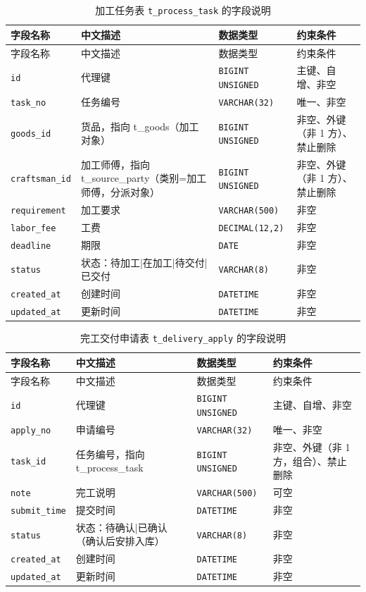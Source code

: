 \documentclass[12pt, a4paper]{ctexart}
\newcommand{\code}[1]{\texttt{\small #1}}
\begin{document}
\begin{longtable}{@{}p{3.1cm} p{4.5cm} p{2.4cm} p{4.5cm}@{}}
\caption{加工任务表 \code{t\_process\_task} 的字段说明}\label{tab:f-t-process-task}\\
\toprule
字段名称 & 中文描述 & 数据类型 & 约束条件 \\
\midrule
\endfirsthead
\toprule
字段名称 & 中文描述 & 数据类型 & 约束条件 \\
\midrule
\endhead
\bottomrule
\endlastfoot
\code{id} & 代理键 & \code{BIGINT UNSIGNED} & 主键、自增、非空 \\
\code{task\_no} & 任务编号 & \code{VARCHAR(32)} & 唯一、非空 \\
\code{goods\_id} & 货品，指向 t\_goods（加工对象） & \code{BIGINT UNSIGNED} & 非空、外键（非 1 方）、禁止删除 \\
\code{craftsman\_id} & 加工师傅，指向 t\_source\_party（类别=加工师傅，分派对象） & \code{BIGINT UNSIGNED} & 非空、外键（非 1 方）、禁止删除 \\
\code{requirement} & 加工要求 & \code{VARCHAR(500)} & 非空 \\
\code{labor\_fee} & 工费 & \code{DECIMAL(12,2)} & 非空 \\
\code{deadline} & 期限 & \code{DATE} & 非空 \\
\code{status} & 状态：待加工|在加工|待交付|已交付 & \code{VARCHAR(8)} & 非空 \\
\code{created\_at} & 创建时间 & \code{DATETIME} & 非空 \\
\code{updated\_at} & 更新时间 & \code{DATETIME} & 非空 \\
\end{longtable}

\begin{longtable}{@{}p{3.1cm} p{4.5cm} p{2.4cm} p{4.5cm}@{}}
\caption{完工交付申请表 \code{t\_delivery\_apply} 的字段说明}\label{tab:f-t-delivery-apply}\\
\toprule
字段名称 & 中文描述 & 数据类型 & 约束条件 \\
\midrule
\endfirsthead
\toprule
字段名称 & 中文描述 & 数据类型 & 约束条件 \\
\midrule
\endhead
\bottomrule
\endlastfoot
\code{id} & 代理键 & \code{BIGINT UNSIGNED} & 主键、自增、非空 \\
\code{apply\_no} & 申请编号 & \code{VARCHAR(32)} & 唯一、非空 \\
\code{task\_id} & 任务编号，指向 t\_process\_task & \code{BIGINT UNSIGNED} & 非空、外键（非 1 方，组合）、禁止删除 \\
\code{note} & 完工说明 & \code{VARCHAR(500)} & 可空 \\
\code{submit\_time} & 提交时间 & \code{DATETIME} & 非空 \\
\code{status} & 状态：待确认|已确认（确认后安排入库） & \code{VARCHAR(8)} & 非空 \\
\code{created\_at} & 创建时间 & \code{DATETIME} & 非空 \\
\code{updated\_at} & 更新时间 & \code{DATETIME} & 非空 \\
\end{longtable}
\end{document}
